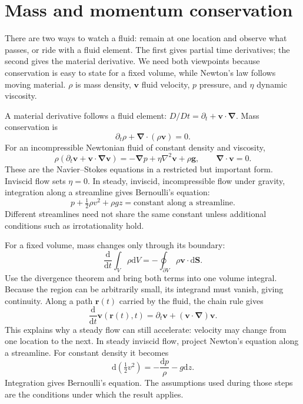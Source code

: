 \documentclass[11pt,oneside]{book}
\newcommand{\dd}{\mathrm{d}}
\newcommand{\vect}[1]{\boldsymbol{#1}}
\newcommand{\grad}{\boldsymbol{\nabla}}
\newcommand{\lap}{\nabla^2}
\newcommand{\od}[2]{\frac{\dd #1}{\dd #2}}
\theoremstyle{reviewstyle}
\begin{document}
\section{Mass and momentum conservation}
There are two ways to watch a fluid: remain at one location and observe what passes, or ride with a fluid element. The first gives partial time derivatives; the second gives the material derivative. We need both viewpoints because conservation is easy to state for a fixed volume, while Newton's law follows moving material. $\rho$ is mass density, $\vect v$ fluid velocity, $p$ pressure, and $\eta$ dynamic viscosity.

A material derivative follows a fluid element:
$D/Dt=\partial_t+\vect v\cdot\grad$. Mass conservation is
\begin{equation}\partial_t\rho+\grad\cdot(\rho\vect v)=0.\end{equation}
For an incompressible Newtonian fluid of constant density and viscosity,
\begin{equation}
\rho\left(\partial_t\vect v+\vect v\cdot\grad\vect v\right)
=-\grad p+\eta\lap\vect v+\rho\vect g,
\qquad \grad\cdot\vect v=0.
\end{equation}
These are the Navier--Stokes equations in a restricted but important form. Inviscid flow sets $\eta=0$. In steady, inviscid, incompressible flow under gravity, integration along a streamline gives Bernoulli's equation:
\begin{equation}p+\tfrac12\rho v^2+\rho gz=\text{constant along a streamline}.\end{equation}
Different streamlines need not share the same constant unless additional conditions such as irrotationality hold.

For a fixed volume, mass changes only through its boundary:
\begin{equation}
\od{}{t}\int_V\rho\dd V=-\oint_{\partial V}\rho\vect v\cdot\dd\vect S.
\end{equation}
Use the divergence theorem and bring both terms into one volume integral. Because the region can be arbitrarily small, its integrand must vanish, giving continuity. Along a path $\vect r(t)$ carried by the fluid, the chain rule gives
\begin{equation}
\od{}{t}\vect v(\vect r(t),t)=\partial_t\vect v+
(\vect v\cdot\grad)\vect v.
\end{equation}
This explains why a steady flow can still accelerate: velocity may change from one location to the next. In steady inviscid flow, project Newton's equation along a streamline. For constant density it becomes
\begin{equation}
\dd\left(\tfrac12v^2\right)=-\frac{\dd p}{\rho}-g\dd z.
\end{equation}
Integration gives Bernoulli's equation. The assumptions used during those steps are the conditions under which the result applies.
\end{document}
